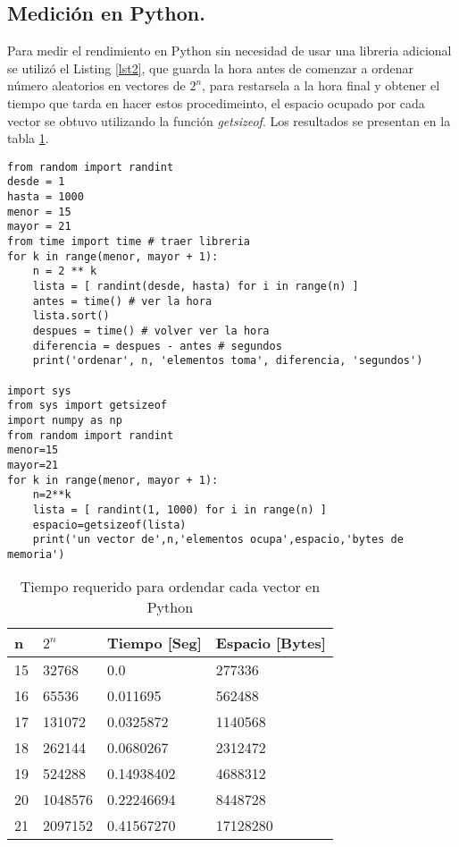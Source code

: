 \documentclass{article}
\begin{document}
\subsection{Medición en Python.} 
Para medir el rendimiento en Python sin necesidad de usar una libreria adicional se utilizó el Listing \ref{lst2}, que guarda la hora antes de comenzar a ordenar número aleatorios en vectores de $2^n$, para restarsela a la hora final y obtener el tiempo que tarda en hacer estos procedimeinto, el espacio ocupado por cada vector se obtuvo utilizando la función \emph{getsizeof}. Los resultados se presentan en la tabla \ref{tabla 2}.
\lstset{language=Python}
\lstset{frame=lines}
\lstset{basicstyle=\footnotesize}
\begin{lstlisting}
from random import randint
desde = 1
hasta = 1000
menor = 15
mayor = 21
from time import time # traer libreria
for k in range(menor, mayor + 1):
    n = 2 ** k
    lista = [ randint(desde, hasta) for i in range(n) ]
    antes = time() # ver la hora
    lista.sort()
    despues = time() # volver ver la hora
    diferencia = despues - antes # segundos
    print('ordenar', n, 'elementos toma', diferencia, 'segundos')
    
import sys
from sys import getsizeof
import numpy as np
from random import randint
menor=15
mayor=21
for k in range(menor, mayor + 1):
    n=2**k
    lista = [ randint(1, 1000) for i in range(n) ]
    espacio=getsizeof(lista)
    print('un vector de',n,'elementos ocupa',espacio,'bytes de memoria')
\end{lstlisting}
\begin{table}[h]
\centering
\begin{tabular}{|l|l|l|l|}
\hline
n  & $2^n$& Tiempo [Seg] & Espacio [Bytes]\\ \hline
15  & 32768                    & 0.0      &  277336                    \\ \hline
16  & 65536                    & 0.011695 & 562488                           \\ \hline
17  & 131072                   & 0.0325872  & 1140568                        \\ \hline
18  & 262144                   & 0.0680267   &  2312472                        \\ \hline
19  & 524288                   & 0.14938402   & 4688312                           \\ \hline
20  & 1048576                  & 0.22246694  & 8448728                           \\ \hline
21  & 2097152                  & 0.41567270  & 17128280                           \\ \hline
\end{tabular}
\caption{Tiempo requerido para ordendar cada vector en Python}
\label{tabla 2}
\end{table}
\end{document}
